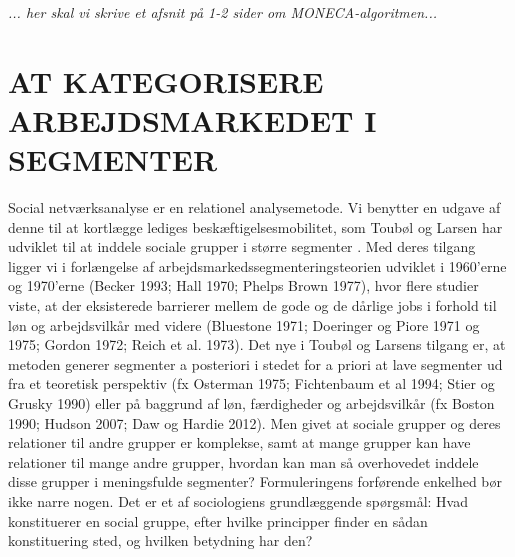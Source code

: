 \emph{... her skal vi skrive et afsnit på 1-2 sider om MONECA-algoritmen...} %







\section{AT KATEGORISERE ARBEJDSMARKEDET I SEGMENTER \label{disco}}

Social netværksanalyse er en relationel analysemetode. Vi benytter en udgave af denne til at kortlægge lediges beskæftigelsesmobilitet, som Toubøl og Larsen har udviklet til at inddele sociale grupper i større segmenter \parencite{TouboelLarsenJensen2013, TouboelLarsen2015}. Med deres tilgang ligger vi i forlængelse af arbejdsmarkedssegmenteringsteorien udviklet i 1960'erne og 1970'erne (Becker 1993; Hall 1970; Phelps Brown 1977), hvor flere studier viste, at der eksisterede barrierer mellem de gode og de dårlige jobs i forhold til løn og arbejdsvilkår med videre (Bluestone 1971; Doeringer og Piore 1971 og 1975; Gordon 1972; Reich et al. 1973). Det nye i Toubøl og Larsens tilgang er, at metoden generer segmenter a posteriori i stedet for a priori at lave segmenter ud fra et teoretisk perspektiv (fx Osterman 1975; Fichtenbaum et al 1994; Stier og Grusky 1990) eller på baggrund af løn, færdigheder og arbejdsvilkår (fx Boston 1990; Hudson 2007; Daw og Hardie 2012). Men givet at sociale grupper og deres relationer til andre grupper er komplekse, samt at mange grupper kan have relationer til mange andre grupper, hvordan kan man så overhovedet inddele disse grupper i meningsfulde segmenter? Formuleringens forførende enkelhed bør ikke narre nogen. Det er et af sociologiens grundlæggende spørgsmål: Hvad konstituerer en social gruppe, efter hvilke principper finder en sådan konstituering sted, og hvilken betydning har den?

